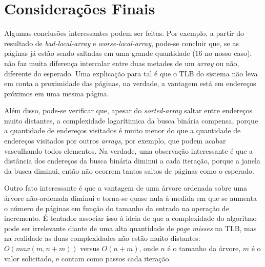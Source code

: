 \documentclass[a4paper]{article}
\begin{document}
\FloatBarrier

\section{Considerações Finais}

Algumas conclusões interessantes podem ser feitas. Por exemplo, a partir do
resultado de \textit{bad-local-array} e \textit{worse-local-array}, pode-se
concluir que, se as páginas já estão sendo saltadas em uma grande quantidade
($16$ no nosso caso), não faz muita diferença intercalar entre duas metades de
um \textit{array} ou não, diferente do esperado. Uma explicação para tal é
que o TLB do sistema não leva em conta a proximidade das páginas, na verdade,
a vantagem está em endereços próximos em uma mesma página.

Além disso, pode-se verificar que, apesar do \textit{sorted-array} saltar entre
endereços muito distantes, a complexidade logarítimica da busca binária
compensa, porque a quantidade de endereços visitados é muito menor do que a
quantidade de endereços visitados por outros \textit{arrays}, por exemplo,
que podem acabar vasculhando todos elementos. Na verdade, uma observação
interessante é que a distância dos endereços da busca binária diminui a cada
iteração, porque a janela da busca diminui, então não ocorrem tantos saltos de
páginas como o esperado.

Outro fato interessante é que a vantagem de uma árvore ordenada sobre uma
árvore não-ordenada diminui e torna-se quase nula à medida em que se aumenta o
número de páginas em função do tamanho da entrada na operação de incremento.
É tentador associar isso à ideia de que a complexidade do algoritmo pode ser
irrelevante diante de uma alta quantidade de \textit{page misses} na TLB, mas na
realidade as duas complexidades não estão muito distantes: $O(max(m, n+m))$ versus
$O(n + m)$, onde $n$ é o tamanho da árvore, $m$ é o valor solicitado, e contam
como passos cada iteração.



\nocite{*}
\printbibliography
\end{document}
